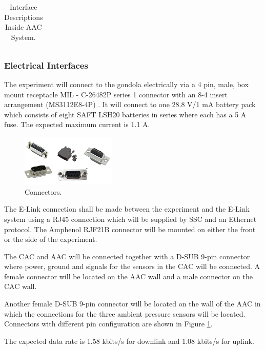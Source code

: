\documentclass[a4paper,12pt,oneside]{article} %
\providecommand{\DIFaddendFL}{} %
\DeclareRobustCommand{\DIFaddendFL}{\DIFOaddendFL \let\includegraphics\DIFOincludegraphics} %
\begin{document}
\begin{table}[H]
{\begin{tabular}{|c|c|c|c|}
\end{tabular}}
\DIFaddendFL \caption{Interface Descriptions Inside AAC System.}
\label{tab:AAC-interfaces}
\end{table}


\subsubsection{Electrical Interfaces}
\label{sec:4.2.3}

The experiment will connect to the gondola electrically via a 4 pin, male, box mount receptacle MIL - C-26482P series 1 connector with an 8-4 insert arrangement (MS3112E8-4P) \cite{BexusManual}. It will connect to one 28.8 V/1 mA battery pack which consists of eight SAFT LSH20 batteries in series where each has a 5 A fuse\cite{BexusManual}. The expected maximum current is 1.1 A.

\begin{figure}[H]
    \centering
    \includegraphics[width=0.4\textwidth]{4-experiment-design/img/connectors.png}
    \caption{Connectors.}
    \label{fig:connectors}
\end{figure}

The E-Link connection shall be made between the experiment and the E-Link system using a RJ45 connection which will be supplied by SSC and an Ethernet protocol. The Amphenol RJF21B connector will be mounted on either the front or the side of the experiment\cite{BexusManual}.  

The CAC and AAC will be connected together with a D-SUB 9-pin connector where power, ground and signals for the sensors in the CAC will be connected. A female connector will be located on the AAC wall and a male connector on the CAC wall.

Another female D-SUB 9-pin connector will be located on the wall of the AAC in which the connections for the three ambient pressure sensors will be located. Connectors with different pin configuration are shown in Figure \ref{fig:connectors}.

The expected data rate is 1.58 kbits/s for downlink and 1.08 kbits/s for uplink.
\end{document}
